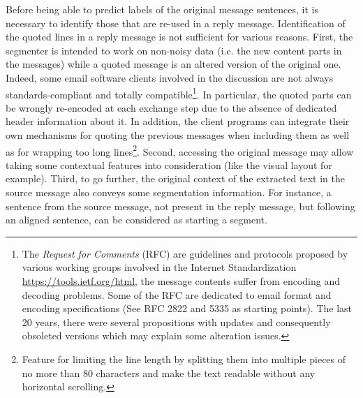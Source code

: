 Before being able to predict labels of the original message sentences, it is necessary to identify those that are re-used in a reply message. 
Identification of the quoted lines in a reply message is not sufficient for various reasons. 
%
First, the segmenter is intended to work on non-noisy data (i.e. the new content parts in the messages) while a quoted message is an altered version of the original one. 
Indeed, some email software clients involved in the discussion %
are not always standards-compliant and totally compatible\footnote{The \textit{Request for Comments} (RFC) are guidelines and protocols proposed by various working groups involved in the Internet Standardization \url{https://tools.ietf.org/html}, the message contents suffer from encoding and decoding problems. Some of the RFC are dedicated to email format and encoding specifications (See RFC 2822 and 5335 as starting points). The last 20 years, there were several propositions with updates and consequently obsoleted versions which may explain some alteration issues.}. 
In particular, the quoted parts can be wrongly re-encoded at each exchange step due to the absence of dedicated header information about it.
In addition, the client programs can integrate their own mechanisms for quoting the previous messages when including them as well as for wrapping too long lines\footnote{Feature for limiting the line length by splitting them into multiple pieces of no more than 80 characters and make the text readable without any horizontal scrolling.}.
%
%
% 
%
Second, accessing the original message may allow taking some contextual features into consideration (like the visual layout for example). 
%
Third, to go further, the original context of the extracted text in the source message also conveys some segmentation information. For instance, a sentence from the source message, not present in the reply message, but following an aligned sentence, can be considered as starting a segment.

